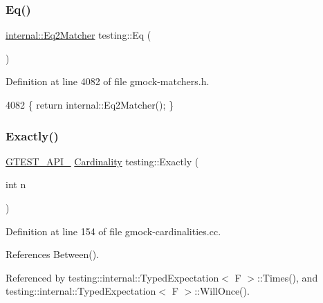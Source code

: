 \subsubsection{\texorpdfstring{Eq()}{Eq()}\hspace{0.1cm}{\footnotesize\ttfamily [2/2]}}
{\footnotesize\ttfamily \hyperlink{classtesting_1_1internal_1_1Eq2Matcher}{internal\+::\+Eq2\+Matcher} testing\+::\+Eq (\begin{DoxyParamCaption}{ }\end{DoxyParamCaption})\hspace{0.3cm}{\ttfamily [inline]}}



Definition at line 4082 of file gmock-\/matchers.\+h.


\begin{DoxyCode}
4082 \{ \textcolor{keywordflow}{return} internal::Eq2Matcher(); \}
\end{DoxyCode}
\mbox{\label{namespacetesting_aa9b1b32ba9e8d3db8ac0af0fc8785c8d}} 
\subsubsection{\texorpdfstring{Exactly()}{Exactly()}}
{\footnotesize\ttfamily \hyperlink{gtest-port_8h_aa73be6f0ba4a7456180a94904ce17790}{G\+T\+E\+S\+T\+\_\+\+A\+P\+I\+\_\+} \hyperlink{classtesting_1_1Cardinality}{Cardinality} testing\+::\+Exactly (\begin{DoxyParamCaption}\item[{int}]{n }\end{DoxyParamCaption})}



Definition at line 154 of file gmock-\/cardinalities.\+cc.



References Between().



Referenced by testing\+::internal\+::\+Typed\+Expectation$<$ F $>$\+::\+Times(), and testing\+::internal\+::\+Typed\+Expectation$<$ F $>$\+::\+Will\+Once().


